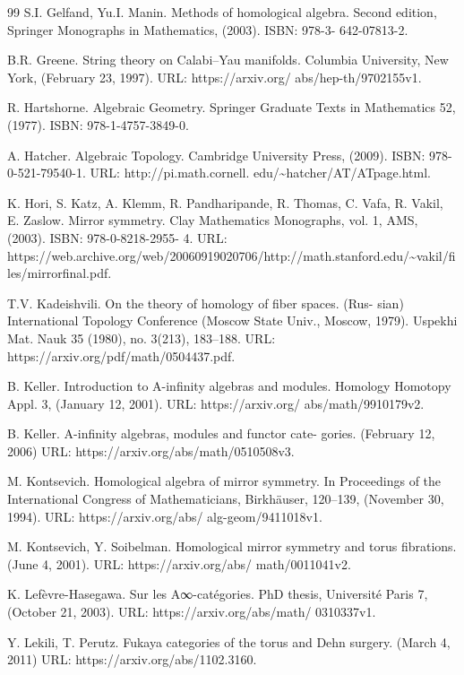 \begin{thebibliography}{99}
 S.I. Gelfand, Yu.I. Manin. Methods of homological algebra. Second edition, Springer Monographs in Mathematics, (2003). ISBN: 978-3- 642-07813-2.

 B.R. Greene. String theory on Calabi–Yau manifolds. Columbia University, New York, (February 23, 1997). URL: https://arxiv.org/ abs/hep-th/9702155v1.

 R. Hartshorne. Algebraic Geometry. Springer Graduate Texts in Mathematics 52, (1977). ISBN: 978-1-4757-3849-0.

 A. Hatcher. Algebraic Topology. Cambridge University Press, (2009). ISBN: 978-0-521-79540-1. URL: http://pi.math.cornell. edu/\textasciitilde{}hatcher/AT/ATpage.html.

 K. Hori, S. Katz, A. Klemm, R. Pandharipande, R. Thomas, C. Vafa, R. Vakil, E. Zaslow. Mirror symmetry. Clay Mathematics Monographs, vol. 1, AMS, (2003). ISBN: 978-0-8218-2955- 4. URL: https://web.archive.org/web/20060919020706/http://math.stanford.edu/\textasciitilde{}vakil/files/mirrorfinal.pdf.

 T.V. Kadeishvili. On the theory of homology of fiber spaces. (Rus- sian) International Topology Conference (Moscow State Univ., Moscow, 1979). Uspekhi Mat. Nauk 35 (1980), no. 3(213), 183–188. URL: https://arxiv.org/pdf/math/0504437.pdf.

 B. Keller. Introduction to A-infinity algebras and modules. Homology Homotopy Appl. 3, (January 12, 2001). URL: https://arxiv.org/ abs/math/9910179v2.

 B. Keller. A-infinity algebras, modules and functor cate- gories. (February 12, 2006) URL: https://arxiv.org/abs/math/0510508v3.

 M. Kontsevich. Homological algebra of mirror symmetry. In Proceedings of the International Congress of Mathematicians, Birkhäuser, 120–139, (November 30, 1994). URL: https://arxiv.org/abs/ alg-geom/9411018v1.

 M. Kontsevich, Y. Soibelman. Homological mirror symmetry and torus fibrations. (June 4, 2001). URL: https://arxiv.org/abs/ math/0011041v2.

 K. Lefèvre-Hasegawa. Sur les A∞-catégories. PhD thesis, Université Paris 7, (October 21, 2003). URL: https://arxiv.org/abs/math/ 0310337v1.

 Y. Lekili, T. Perutz. Fukaya categories of the torus and Dehn surgery. (March 4, 2011) URL: https://arxiv.org/abs/1102.3160.


\end{thebibliography}
